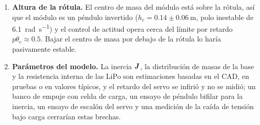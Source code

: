 \begin{enumerate}[label=(\roman*)]
  \item \textbf{Altura de la rótula.} El centro de masa del módulo está sobre la rótula, así que el módulo es un péndulo invertido ($h_c=0.14\pm\SI{0.06}{\metre}$, polo inestable de \SI{6.1}{\radian\per\second}) y el control de actitud opera cerca del límite por retardo $p\theta_e\approx0.5$. Bajar el centro de masa por debajo de la rótula lo haría pasivamente estable.
  \item \textbf{Parámetros del modelo.} La inercia $\bm{J}$, la distribución de masas de la base y la resistencia interna de las LiPo son estimaciones basadas en el CAD, en pruebas o en valores típicos, y el retardo del servo se infirió y no se midió; un banco de empuje con celda de carga, un ensayo de péndulo bifilar para la inercia, un ensayo de escalón del servo y una medición de la caída de tensión bajo carga cerrarían estas brechas.
\end{enumerate}
